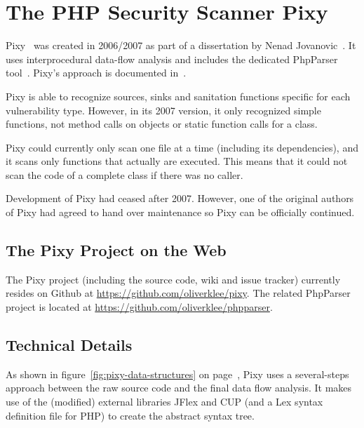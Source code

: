 \chapter{The PHP Security Scanner Pixy}
\label{pixy}
Pixy~\cite{pixy} was created in 2006/2007 as part of a dissertation by Nenad Jovanovic~\cite{pixy-dissertation}. It uses interprocedural data-flow analysis and includes the dedicated PhpParser tool~\cite{phpparser}. Pixy's approach is documented in~\cite{pixy-short, pixy-long, pixy-technical, pixy-dissertation}.

Pixy is able to recognize sources, sinks and sanitation functions specific for each vulnerability type. However, in its 2007 version, it only recognized simple functions, not method calls on objects or static function calls for a class.

Pixy could currently only scan one file at a time (including its dependencies), and it scans only functions that actually are executed. This means that it could not scan the code of a complete class if there was no caller.

Development of Pixy had ceased after 2007. However, one of the original authors of Pixy had agreed to hand over maintenance so Pixy can be officially continued.

\section{The Pixy Project on the Web}

The Pixy project (including the source code, wiki and issue tracker) currently resides on Github at \url{https://github.com/oliverklee/pixy}. The related PhpParser project is located at \url{https://github.com/oliverklee/phpparser}.

\section{Technical Details}

As shown in figure~\ref{fig:pixy-data-structures} on page~\pageref{fig:pixy-data-structures}, Pixy uses a several-steps approach between the raw source code and the final data flow analysis. It makes use of the (modified) external libraries JFlex and CUP (and a Lex syntax definition file for PHP) to create the abstract syntax tree.

